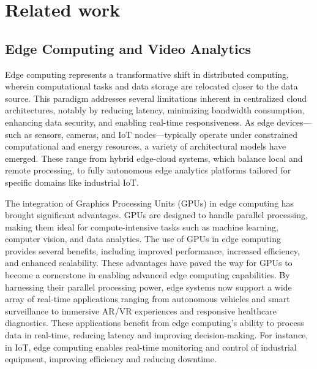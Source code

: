 \setchapterpreamble[u]{\margintoc}
\chapter{Related work}



\section{Edge Computing and Video Analytics}

Edge computing represents a transformative shift in distributed computing, wherein computational tasks and data storage are relocated closer to the data source. This paradigm addresses several limitations inherent in centralized cloud architectures, notably by reducing latency, minimizing bandwidth consumption, enhancing data security, and enabling real-time responsiveness. As edge devices—such as sensors, cameras, and IoT nodes—typically operate under constrained computational and energy resources, a variety of architectural models have emerged. These range from hybrid edge-cloud systems, which balance local and remote processing, to fully autonomous edge analytics platforms tailored for specific domains like industrial IoT.

The integration of Graphics Processing Units (GPUs) in edge computing has brought significant advantages. GPUs are designed to handle parallel processing, making them ideal for compute-intensive tasks such as machine learning, computer vision, and data analytics. The use of GPUs in edge computing provides several benefits, including improved performance, increased efficiency, and enhanced scalability. These advantages have paved the way for GPUs to become a cornerstone in enabling advanced edge computing capabilities. By harnessing their parallel processing power, edge systems now support a wide array of real-time applications ranging from autonomous vehicles and smart surveillance to immersive AR/VR experiences and responsive healthcare diagnostics. These applications benefit from edge computing's ability to process data in real-time, reducing latency and improving decision-making. For instance, in IoT, edge computing enables real-time monitoring and control of industrial equipment, improving efficiency and reducing downtime.


